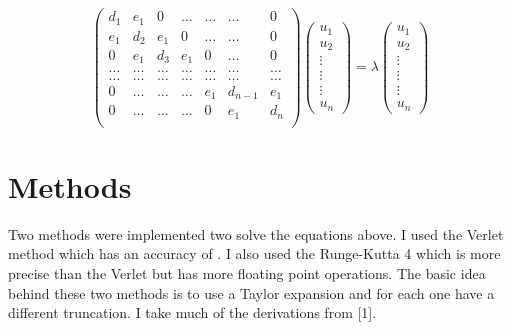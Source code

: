 \documentclass[11pt,a4wide]{article}
\begin{document}
\begin{equation}
\left(\begin{array}{ccccccc}
 	d_1& e_1& 0& \dots& \dots&  \dots &0\\
    e_1& d_2& e_1& 0& \dots& \dots &0 \\
    0& e_1 &d_3 & e_1 & 0 & \dots &0\\
    \dots& \dots   & \dots &\dots   &\dots & \dots &\dots\\
    \dots &\dots &\dots &\dots &\dots &\dots &\dots \\
    0 &\dots   &\dots  &\dots &e_1 &d_{n -1}& e_1 \\
    0 &\dots    &\dots  &\dots & 0  & e_1 & d_n \\
    \end{array} \right)   \left(\begin{array}{c}
    											u_1 \\
    											u_2 \\
    											\vdots \\ \vdots \\ \vdots \\ 
    											u_n
    			                \end{array}\right) = \lambda \left(\begin{array}{c}
    											u_1 \\
    											u_2 \\
    											\vdots \\ \vdots \\ \vdots \\ 
    											u_n
    			                \end{array}\right)        
\end{equation}

\section{Methods}
Two methods were implemented two solve the equations above. I used the Verlet method which has an accuracy of . I also used the Runge-Kutta 4 which is more precise than the Verlet but has more floating point operations. The basic idea behind these two methods is to use a Taylor expansion and for each one have a different truncation. I take much of the derivations from [1]. 
\end{document}
